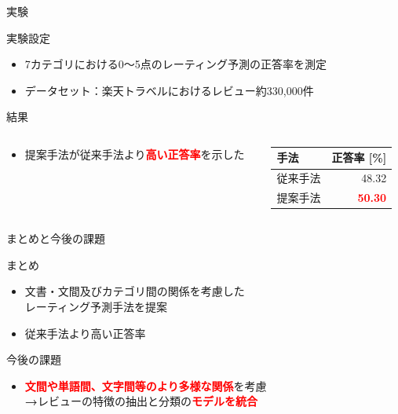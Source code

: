 \documentclass[aspectratio=43,unicode,10pt]{beamer}
\newcommand{\fire}[1]{\textcolor{red}{\textbf{#1}}}
\newcommand{\arrow}{\textcolor{ttiblue}{\textbf{→}}\hspace{1ex}}
\begin{document}
\begin{frame}{実験}{}
  \begin{block}{実験設定}
    \begin{itemize}
      \item 7カテゴリにおける0〜5点のレーティング予測の正答率を測定
      \item データセット：楽天トラベルにおけるレビュー約330,000件
    \end{itemize}
  \end{block}
  \begin{block}{結果}
    \begin{columns}[onlytextwidth,t]
      \begin{column}{0.6\linewidth}
        \begin{itemize}
          \item 提案手法が従来手法より\fire{高い正答率}を示した
        \end{itemize}
      \end{column}
      \begin{column}{0.4\linewidth}
        \begin{table}
          \centering
          \begin{tabular}{l | r}
            手法 & 正答率 {[}\%{]} \\
            \hline
            従来手法 & 48.32 \\
            提案手法 & \fire{50.30} \\
          \end{tabular}
        \end{table}
      \end{column}
    \end{columns}
  \end{block}
\end{frame}

\begin{frame}{まとめと今後の課題}{}
  \begin{block}{まとめ}
    \begin{itemize}
      \item 文書・文間及びカテゴリ間の関係を考慮した \\
            レーティング予測手法を提案
      \item 従来手法より高い正答率
    \end{itemize}
  \end{block}
  \begin{block}{今後の課題}
    \begin{itemize}
      \item \fire{文間や単語間、文字間等のより多様な関係}を考慮 \\
            \arrow レビューの特徴の抽出と分類の\fire{モデルを統合}
    \end{itemize}
  \end{block}
\end{frame}
\end{document}
